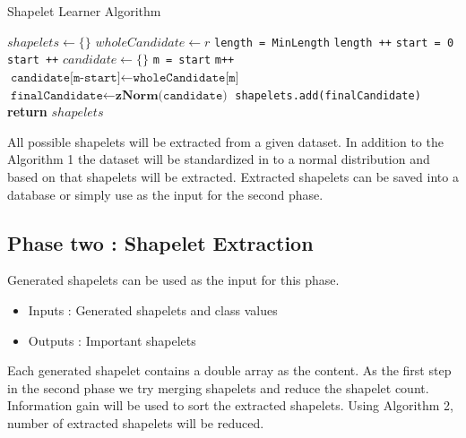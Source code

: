 \documentclass[letterpaper, 10 pt, conference]{IEEEtran}  %
\begin{document}
\begin{algorithm}[H]
  \caption{Shapelet Learner Algorithm}\label{shapeletLearner}
  \begin{algorithmic}[1]
     \State $shapelets \gets \{\}$
      	\State $wholeCandidate \gets r$
        \State \texttt{length = MinLength}
        \State \texttt{length ++}
        \State \texttt{start = 0}
            \State \texttt{start ++}
            \State $candidate \gets \{\}$
            \State \texttt{m = start}
                	\State \texttt{m++}
                    \State $\texttt{candidate[m-start]}\gets \texttt{wholeCandidate[m]}$
                \EndWhile
                \State $\texttt{finalCandidate} \gets \textbf{zNorm(}\texttt{candidate}\textbf{)}$
                \State \texttt{shapelets.add(finalCandidate)}
            \EndWhile
        \EndWhile
      \EndFor
      \State \textbf{return} $shapelets$
    \EndProcedure
  \end{algorithmic}
\end{algorithm}



All possible shapelets will be extracted from a given dataset. In addition to the Algorithm 1 the dataset will be standardized in to a normal distribution and based on that shapelets will be extracted. Extracted shapelets can be saved into a database or simply use as the input for the second phase. 

\subsection{Phase two : Shapelet Extraction}
Generated shapelets can be used as the input for this phase.
\begin{itemize}
\item Inputs : Generated shapelets and class values
\item Outputs : Important shapelets
\end{itemize}

Each generated shapelet contains a double array as the content. As the first step in the second phase we try merging shapelets and reduce the shapelet count. Information gain will be used to sort the extracted shapelets. Using Algorithm 2, number of extracted shapelets will be reduced. 
\end{document}
